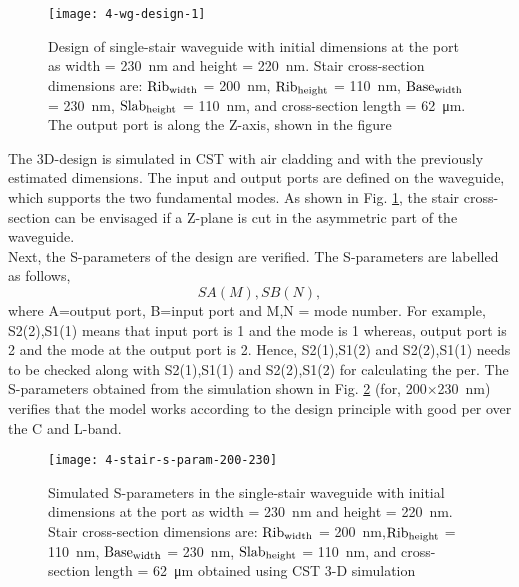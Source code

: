 \documentclass[../report.tex]{subfiles}
\begin{document}
\begin{figure}[H] %
	\centering
	\texttt{[image: 4-wg-design-1]}
	\caption{Design of single-stair waveguide with initial dimensions at the port as width = \SI{230}{\nano \meter} and height = \SI{220}{\nano \meter}. Stair cross-section dimensions are: $\mathrm{Rib_{width}}$ = \SI{200}{\nano \meter}, $\mathrm{Rib_{height}}$ = \SI{110}{\nano \meter}, $\mathrm{Base_{width}}$ = \SI{230}{\nano \meter}, $\mathrm{Slab_{height}}$ = \SI{110}{\nano \meter}, and cross-section length = \SI{62}{\micro\meter}. The output port is along the Z-axis, shown in the figure}
	\label{fig:4_wg_design_1}
\end{figure}

\noindent The 3D-design is simulated in CST with air cladding and with the previously estimated dimensions. The input and output ports are defined on the waveguide, which supports the two fundamental modes. As shown in Fig. \ref{fig:4_wg_design_1}, the stair cross-section can be envisaged if a Z-plane is cut in the asymmetric part of the waveguide.\\

\noindent Next, the S-parameters of the design are verified. The S-parameters are labelled as follows,
\begin{equation}\label{eq:s_parameter_label}
SA(M),SB(N),
\end{equation}
where A=output port, B=input port and M,N = mode number. For example, S2(2),S1(1) means that input port is 1 and the mode is 1 whereas, output port is 2 and the mode at the output port is 2. Hence, S2(1),S1(2) and S2(2),S1(1) needs to be checked along with S2(1),S1(1) and S2(2),S1(2) for calculating the \gls{per}. The S-parameters obtained from the simulation shown in Fig. \ref{fig:4_stair_s_param_200_230} (for, 200$\times$\SI{230}{\nano \meter}) verifies that the model works according to the design principle with good \gls{per} over the C and L-band. 


\begin{figure}[H] %
	\centering
	\texttt{[image: 4-stair-s-param-200-230]}
	\caption{Simulated S-parameters in the single-stair waveguide with initial dimensions at the port as width = \SI{230}{\nano \meter} and height = \SI{220}{\nano \meter}. Stair cross-section dimensions are: $\mathrm{Rib_{width}}$ = \SI{200}{\nano \meter},$\mathrm{Rib_{height}}$ = \SI{110}{\nano \meter}, $\mathrm{Base_{width}}$ = \SI{230}{\nano \meter}, $\mathrm{Slab_{height}}$ = \SI{110}{\nano \meter}, and cross-section length = \SI{62}{\micro\meter} obtained using CST 3-D simulation}
	\label{fig:4_stair_s_param_200_230}
\end{figure}
\end{document}
